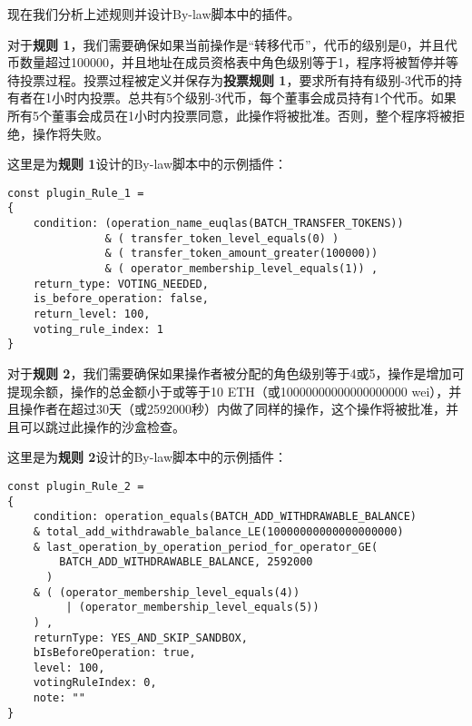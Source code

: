 \documentclass[main.tex]{subfiles}
\begin{document}
现在我们分析上述规则并设计By-law脚本中的插件。

对于\textbf{规则 1}，我们需要确保如果当前操作是“转移代币”，代币的级别是0，并且代币数量超过100000，并且地址在成员资格表中角色级别等于1，程序将被暂停并等待投票过程。投票过程被定义并保存为\textbf{投票规则 1}，要求所有持有级别-3代币的持有者在1小时内投票。总共有5个级别-3代币，每个董事会成员持有1个代币。如果所有5个董事会成员在1小时内投票同意，此操作将被批准。否则，整个程序将被拒绝，操作将失败。

这里是为\textbf{规则 1}设计的By-law脚本中的示例插件：

\begin{verbatim}
const plugin_Rule_1 = 
{
    condition: (operation_name_euqlas(BATCH_TRANSFER_TOKENS))
               & ( transfer_token_level_equals(0) )
               & ( transfer_token_amount_greater(100000)) 
               & ( operator_membership_level_equals(1)) ,
    return_type: VOTING_NEEDED,
    is_before_operation: false,
    return_level: 100,
    voting_rule_index: 1
}
\end{verbatim}

对于\textbf{规则 2}，我们需要确保如果操作者被分配的角色级别等于4或5，操作是增加可提现余额，操作的总金额小于或等于10 ETH（或10000000000000000000 wei），并且操作者在超过30天（或2592000秒）内做了同样的操作，这个操作将被批准，并且可以跳过此操作的沙盒检查。

这里是为\textbf{规则 2}设计的By-law脚本中的示例插件：

\begin{verbatim}
const plugin_Rule_2 = 
{
    condition: operation_equals(BATCH_ADD_WITHDRAWABLE_BALANCE)
    & total_add_withdrawable_balance_LE(10000000000000000000)
    & last_operation_by_operation_period_for_operator_GE(
        BATCH_ADD_WITHDRAWABLE_BALANCE, 2592000
      )
    & ( (operator_membership_level_equals(4)) 
         | (operator_membership_level_equals(5)) 
    ) ,
    returnType: YES_AND_SKIP_SANDBOX,
    bIsBeforeOperation: true,
    level: 100,
    votingRuleIndex: 0,
    note: ""
}
\end{verbatim}
\end{document}
